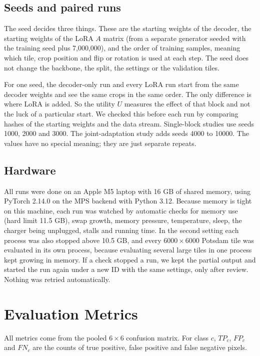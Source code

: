 \documentclass[11pt,a4paper]{report}
\begin{document}
\subsection{Seeds and paired runs}

The seed decides three things. These are the starting weights of the decoder, the starting weights of the LoRA $A$ matrix (from a separate generator seeded with the training seed plus 7,000,000), and the order of training samples, meaning which tile, crop position and flip or rotation is used at each step. The seed does not change the backbone, the split, the settings or the validation tiles.

For one seed, the decoder-only run and every LoRA run start from the same decoder weights and see the same crops in the same order. The only difference is where LoRA is added. So the utility $U$ measures the effect of that block and not the luck of a particular start. We checked this before each run by comparing hashes of the starting weights and the data stream. Single-block studies use seeds 1000, 2000 and 3000. The joint-adaptation study adds seeds 4000 to 10000. The values have no special meaning; they are just separate repeats.

\subsection{Hardware}

All runs were done on an Apple M5 laptop with 16 GB of shared memory, using PyTorch 2.14.0 on the MPS backend with Python 3.12. Because memory is tight on this machine, each run was watched by automatic checks for memory use (hard limit 11.5 GB), swap growth, memory pressure, temperature, sleep, the charger being unplugged, stalls and running time. In the second setting each process was also stopped above 10.5 GB, and every $6000 \times 6000$ Potsdam tile was evaluated in its own process, because evaluating several large tiles in one process kept growing in memory. If a check stopped a run, we kept the partial output and started the run again under a new ID with the same settings, only after review. Nothing was retried automatically.

\section{Evaluation Metrics}

All metrics come from the pooled $6 \times 6$ confusion matrix. For class $c$, $TP_c$, $FP_c$ and $FN_c$ are the counts of true positive, false positive and false negative pixels.
\end{document}
